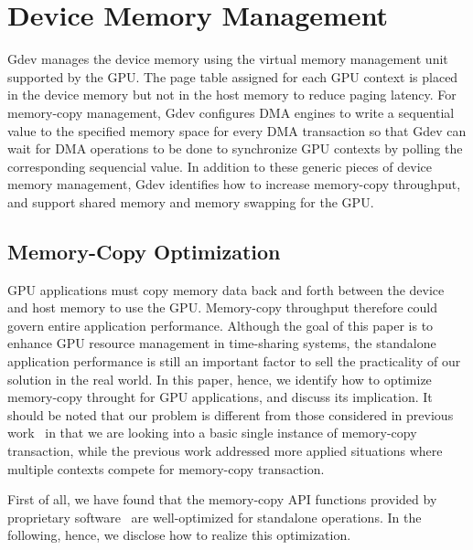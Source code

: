\section{Device Memory Management}
\label{sec:memory_management}

Gdev manages the device memory using the virtual memory management unit
supported by the GPU.
The page table assigned for each GPU context is placed in the device
memory but not in the host memory to reduce paging latency.
For memory-copy management, Gdev configures DMA engines to write a
sequential value to the specified memory space for every DMA transaction
so that Gdev can wait for DMA operations to be done to synchronize
GPU contexts by polling the corresponding sequencial value.
In addition to these generic pieces of device memory management, Gdev
identifies how to increase memory-copy throughput, and support shared
memory and memory swapping for the GPU.

\subsection{Memory-Copy Optimization}
\label{sec:memory_copy}

GPU applications must copy memory data back and forth between the device
and host memory to use the GPU.
Memory-copy throughput therefore could govern entire application
performance.
Although the goal of this paper is to enhance GPU resource management in
time-sharing systems, the standalone application performance is still an
important factor to sell the practicality of our solution in the
real world.
In this paper, hence, we identify how to optimize memory-copy throught
for GPU applications, and discuss its implication.
It should be noted that our problem is different from those considered
in previous work~\cite{Jablin_PLDI11, Rossbach_SOSP11} in that we are
looking into a basic single instance of memory-copy transaction, while
the previous work addressed more applied situations where multiple
contexts compete for memory-copy transaction.

First of all, we have found that the memory-copy API functions provided
by proprietary software~\cite{CUDA40} are well-optimized for standalone
operations.
In the following, hence, we disclose how to realize this optimization.

